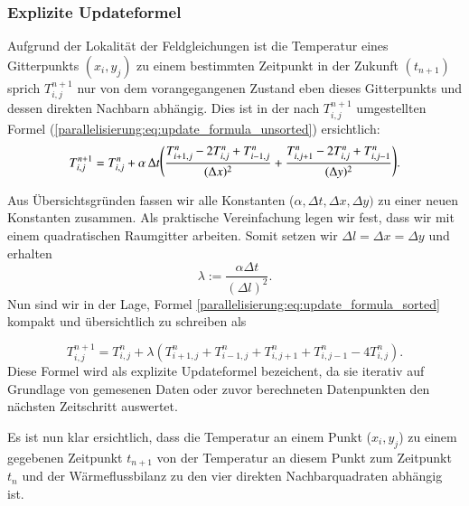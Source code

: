 \subsubsection{Explizite Updateformel}
\label{parallelisierung:sec:update_formel}
%


Aufgrund der Lokalität der Feldgleichungen ist die Temperatur eines Gitterpunkts \( (x_i, y_j)\) zu einem bestimmten Zeitpunkt in der Zukunft \( (t_{n+1})\) sprich \(T_{i,j}^{n+1}\) nur von dem  vorangegangenen Zustand eben dieses Gitterpunkts und dessen direkten Nachbarn abhängig.
Dies ist  in der nach \(T_{i,j}^{n+1}\) umgestellten Formel (\ref{parallelisierung:eq:update_formula_unsorted}) ersichtlich:
\begin{equation}
	\label{parallelisierung:eq:update_formula_sorted}
	T_{i,j}^{n+1}
	=
	T_{i,j}^n
	+
	\alpha \, \Delta t
	\raisebox{1.5pt}{$\displaystyle
	\Biggl(
	\raisebox{-1.5pt}{$\displaystyle
	\frac{T_{i+1,j}^n - 2 T_{i,j}^n + T_{i-1,j}^n}{(\Delta x)^2}
	+
	\frac{T_{i,j+1}^n - 2 T_{i,j}^n + T_{i,j-1}^n}{(\Delta y)^2}
	$}
	\Biggr)
	$}
	.
\end{equation}

Aus Übersichtsgründen fassen wir alle Konstanten (\(\alpha, \Delta t, \Delta x, \Delta y) \) zu einer neuen Konstanten zusammen.
Als praktische Vereinfachung legen wir fest, dass wir mit einem quadratischen Raumgitter arbeiten. Somit setzen wir  \(\Delta l = \Delta x = \Delta y\) und erhalten
%
\begin{equation}
	\label{parallelisierung:eq:lambda}
	\lambda 
	:= 
	\frac{\alpha \Delta t}{(\Delta l)^2}.
\end{equation}
Nun sind wir in der Lage, Formel \eqref{parallelisierung:eq:update_formula_sorted} kompakt und übersichtlich zu schreiben als

\begin{equation}
	\label{parallelisierung:eq:update_formel}
	T_{i,j}^{n+1}
	=
	T_{i,j}^n +
	\lambda \left(
	T_{i+1,j}^n + T_{i-1,j}^n + T_{i,j+1}^n + T_{i,j-1}^n - 4 T_{i,j}^n
	\right).
\end{equation}
Diese Formel wird als explizite Updateformel bezeichent, da sie iterativ auf Grundlage von gemesenen Daten oder zuvor berechneten Datenpunkten den nächsten Zeitschritt auswertet.

Es ist nun klar ersichtlich, dass die Temperatur an einem Punkt (\(x_i, y_j\)) zu einem gegebenen Zeitpunkt \(t_{n+1}\)  von der Temperatur an diesem Punkt zum Zeitpunkt \(t_n\) und der Wärmeflussbilanz zu den vier direkten Nachbarquadraten abhängig ist.

